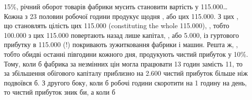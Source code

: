 \parcont{}  %
15\%, річний оборот товарів фабрики мусить становити вартість у 115.000\dots{} Кожна з
23 половин робочої години продукує щодня , або  цих 115.000. З цих ,
що становлять цілість цих 115.000 (constituting the whole 115.000), , тобто
100.000 з цих 115.000 повертають назад лише капітал, , або 5.000, із гуртового прибутку в 115.000 (!) покривають зужитковання фабрики і машин. Решта ж,
, тобто обидві останні півгодини кожного дня, продукують чистий прибуток
у 10\%. Тому, коли б фабрика за незмінних цін могла працювати 13 годин замість 11, то за
збільшення обігового
капіталу приблизно на 2.600 чистий прибуток більше ніж подвоївся б. З другого
боку, коли б робочі години скоротити на 1 годину на день, то чистий прибуток зник би, а коли б
